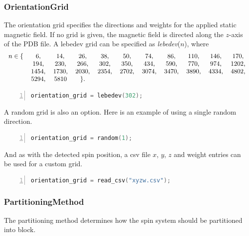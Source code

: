 \documentclass{book}
\begin{document}
\subsubsection{OrientationGrid} %
The orientation grid specifies the directions and weights for the applied 
static magnetic field.  If no grid is given, the magnetic field is directed 
along the $z$-axis of the PDB file.
A lebedev grid \cite{1999_Lebedev} can be specified as \textit{lebedev}($n$),
where  
\begin{equation}
\begin{tabular}{c c c c c c c c c c c}
$n \in \{$
  & 6, &  14, &  26, &  38, &  50, &  
  74, &  86, & 110, & 146, & 170,  
\\
& 194, & 230, & 266, & 302, & 350, & 
434, & 590, & 770, & 974, &1202, 
\\
& 1454, &1730, &2030, & 2354, & 2702, &
3074, &3470, &3890, & 4334, & 4802, 
\\
& 5294,& 5810 & $\}$. & & & & & & &  
\end{tabular}
\end{equation}
\begin{lstlisting}[frame=single,numbers=left,language=c]
orientation_grid = lebedev(302);
\end{lstlisting}
A random grid is also an option.  Here is an example of using a single random
direction. 
\begin{lstlisting}[frame=single,numbers=left,language=c]
orientation_grid = random(1);
\end{lstlisting}
And as with the detected spin position, a csv file $x$, $y$, $z$ and weight
entries can be used for a custom grid.
\begin{lstlisting}[frame=single,numbers=left,language=c]
orientation_grid = read_csv("xyzw.csv");
\end{lstlisting}

\subsubsection{PartitioningMethod} %
The partitioning method determines how the spin system should be partitioned
into block. 
\end{document}
